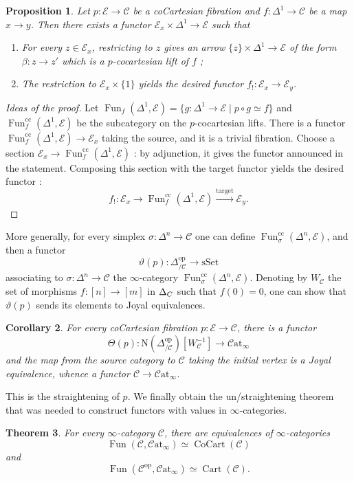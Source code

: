 \documentclass[11pt]{article}
\newtheorem{theorem}{Theorem}[section]
\newtheorem{proposition}[theorem]{Proposition}
\newtheorem{corollary}[theorem]{Corollary}
\theoremstyle{definition}
\newcommand{\C}{\mathcal{C}}
\newcommand{\Catinf}{\mathcal{C}\mathrm{at}_{\infty}}
\newcommand{\cc}{\mathrm{cc}}
\newcommand{\E}{\mathcal{E}}
\newcommand{\Fun}{\operatorname{Fun}}
\newcommand{\N}{\mathrm{N}}
\newcommand{\op}{\mathrm{op}}
\newcommand{\sSet}{\mathrm{sSet}}
\begin{document}
\begin{proposition}
    Let $p : \E \to \C$ be a coCartesian fibration and $f : \Delta^1 \to \C$ be a map $x \to y$.
    Then there exists a functor $\E_x \times \Delta^1 \to \E$ such that
    \begin{enumerate}
        \item For every $z \in \E_x$, restricting to $z$ gives an arrow $\{z\} \times \Delta^1 \to \E$ of the form $\beta : z \to z'$ which is a $p$-cocartesian lift of $f$ ;
        \item The restriction to $\E_x \times \{1\}$ yields the desired functor $f_! : \E_x \to \E_y$.
    \end{enumerate}
\end{proposition}
\begin{proof}[Ideas of the proof]
    Let $\Fun_f(\Delta^1, \E) = \{g : \Delta^1 \to \E \mid p \circ g \simeq f\}$ and $\Fun_f^{\cc}(\Delta^1, \E)$ be the subcategory on the $p$-cocartesian lifts.
    There is a functor $\Fun_f^{\cc}(\Delta^1, \E) \to \E_x$ taking the source, and it is a trivial fibration.
    Choose a section $\E_x \to \Fun_f^{\cc}(\Delta^1, \E)$ : by adjunction, it gives the functor announced in the statement.
    Composing this section with the target functor yields the desired functor :
    \[
        f_! : \E_x \to \Fun_f^{\cc}(\Delta^1, \E) \xrightarrow{\text{target}} \E_y.
    \]
\end{proof}

More generally, for every simplex $\sigma : \Delta^n \to \C$ one can define $\Fun_{\sigma}^{\cc}(\Delta^n, \E)$, and then a functor
\[
    \vartheta(p) : \Delta^{\op}_{/\C} \to \sSet
\]
associating to $\sigma : \Delta^n \to \C$ the $\infty$-category $\Fun_{\sigma}^{\cc}(\Delta^n, \E)$.
Denoting by $W_{\C}$ the set of morphisms $f : [n] \to [m]$ in $\Delta_{\/C}$ such that $f(0) = 0$, one can show that $\vartheta(p)$ sends its elements to Joyal equivalences.

\begin{corollary}
    For every coCartesian fibration $p : \E \to \C$, there is a functor
    \[
        \Theta(p) : \N(\Delta^{\op}_{/\C})[W_{\C}^{-1}] \to \Catinf
    \]
    and the map from the source category to $\C$ taking the initial vertex is a Joyal equivalence, whence a functor $\C \to \Catinf$.
\end{corollary}
This is the straightening of $p$.
We finally obtain the un/straightening theorem that was needed to construct functors with values in $\infty$-categories.
\begin{theorem}
    For every $\infty$-category $\C$, there are equivalences of $\infty$-categories
    \[
        \Fun(\C, \Catinf) \simeq \operatorname{CoCart}(\C)
    \]
    and
    \[
        \Fun(\C^{\op}, \Catinf) \simeq \operatorname{Cart}(\C).
    \]
\end{theorem}
\end{document}
